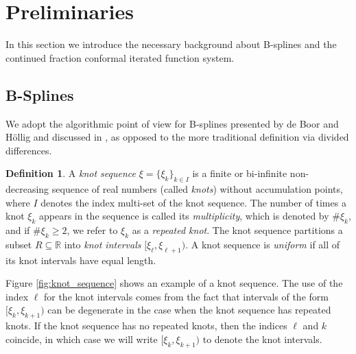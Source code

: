\documentclass[10pt]{article}
\theoremstyle{definition}
\newtheorem{definition}{Definition}[section]
\numberwithin{equation}{section}
\numberwithin{figure}{section}
\numberwithin{table}{section}
\begin{document}
\section{Preliminaries}

In this section we introduce the necessary background about B-splines and the continued fraction conformal iterated function system. 

\subsection{B-Splines}

We adopt the algorithmic point of view for B-splines presented by de Boor and H\"{o}llig and discussed in \cite{hollig2013approximation}, as opposed to the more traditional definition via divided differences.

\begin{definition}
A \textit{knot sequence} $\xi=\{\xi_k\}_{k\in I}$ is a finite or bi-infinite non-decreasing sequence of real numbers (called \textit{knots}) without accumulation points, where $I$ denotes the index multi-set of the knot sequence. The number of times a knot $\xi_k$ appears in the sequence is called its \textit{multiplicity}, which is denoted by $\#\xi_k$, and if $\#\xi_k\geq2$, we refer to $\xi_k$ as a \textit{repeated knot}. The knot sequence partitions a subset $R\subseteq\mathbb{R}$ into \textit{knot intervals} $[\xi_\ell,\xi_{\ell+1})$. A knot sequence is \textit{uniform} if all of its knot intervals have equal length.
\end{definition}

Figure \ref{fig:knot_sequence} shows an example of a knot sequence. The use of the index $\ell$ for the knot intervals comes from the fact that intervals of the form $[\xi_k,\xi_{k+1})$ can be degenerate in the case when the knot sequence has repeated knots. If the knot sequence has no repeated knots, then the indices $\ell$ and $k$ coincide, in which case we will write $[\xi_k,\xi_{k+1})$ to denote the knot intervals.
\end{document}

